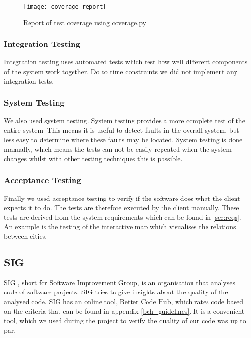 \begin{figure}[ht]
\centering
\texttt{[image: coverage-report]}
\caption{Report of test coverage using coverage.py}
\label{fig:cov-report}
\end{figure}

\subsubsection{Integration Testing}
Integration testing uses automated tests which test how well different components of the system work together. Do to time constraints we did not implement any integration tests. 

\subsubsection{System Testing}
We also used system testing. System testing provides a more complete test of the entire system. This means it is useful to detect faults in the overall system, but less easy to determine where these faults may be located. System testing is done manually, which means the tests can not be easily repeated when the system changes whilst with other testing techniques this is possible.

\subsubsection{Acceptance Testing}\label{sec:acceptance-testing}
Finally we used acceptance testing to verify if the software does what the client expects it to do. The tests are therefore executed by the client manually. These tests are derived from the system requirements which can be found in \ref{sec:reqs}.\\
An example is the testing of the interactive map which visualises the relations between cities.

\subsection{SIG}
SIG \cite{sig}, short for Software Improvement Group, is an organisation that analyses code of software projects. SIG tries to give insights about the quality of the analysed code. SIG has an online tool, Better Code Hub, which rates code based on the criteria that can be found in appendix \ref{bch_guidelines}. It is a convenient tool, which we used during the project to verify the quality of our code was up to par.

